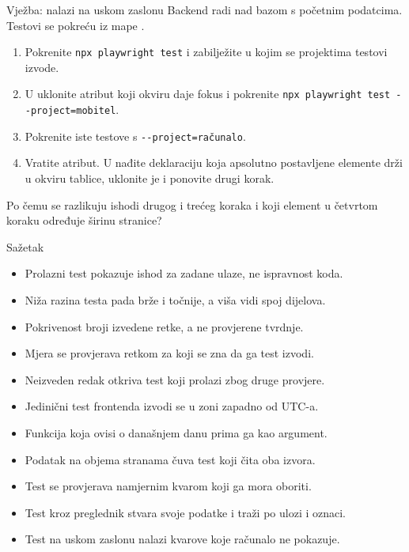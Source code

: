 \begin{frame}{Vježba: nalazi na uskom zaslonu}
Backend radi nad bazom s početnim podatcima. Testovi se pokreću iz mape .

\vspace{0.7em}
\begin{enumerate}
  \itemsep0.35em
  \item Pokrenite \texttt{npx playwright test} i zabilježite u kojim se projektima testovi izvode.
  \item U  uklonite atribut koji okviru daje fokus i pokrenite \texttt{npx playwright test -{}-project=mobitel}.
  \item Pokrenite iste testove s \texttt{-{}-project=računalo}.
  \item Vratite atribut. U  nađite deklaraciju koja apsolutno postavljene elemente drži u okviru tablice, uklonite je i ponovite drugi korak.
\end{enumerate}

\vspace{0.7em}
Po čemu se razlikuju ishodi drugog i trećeg koraka i koji element u četvrtom koraku određuje širinu stranice?
\end{frame}

\begin{frame}{Sažetak}
\begin{itemize}
  \itemsep0.2em
  \item Prolazni test pokazuje ishod za zadane ulaze, ne ispravnost koda.
  \item Niža razina testa pada brže i točnije, a viša vidi spoj dijelova.
  \item Pokrivenost broji izvedene retke, a ne provjerene tvrdnje.
  \item Mjera se provjerava retkom za koji se zna da ga test izvodi.
  \item Neizveden redak otkriva test koji prolazi zbog druge provjere.
  \item Jedinični test frontenda izvodi se u zoni zapadno od UTC-a.
  \item Funkcija koja ovisi o današnjem danu prima ga kao argument.
  \item Podatak na objema stranama čuva test koji čita oba izvora.
  \item Test se provjerava namjernim kvarom koji ga mora oboriti.
  \item Test kroz preglednik stvara svoje podatke i traži po ulozi i oznaci.
  \item Test na uskom zaslonu nalazi kvarove koje računalo ne pokazuje.
\end{itemize}
\end{frame}


